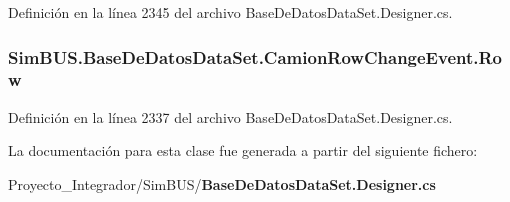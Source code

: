 Definición en la línea 2345 del archivo Base\-De\-Datos\-Data\-Set.\-Designer.\-cs.

\subsubsection[{Row}]{ Sim\-B\-U\-S.\-Base\-De\-Datos\-Data\-Set.\-Camion\-Row\-Change\-Event.\-Row\hspace{0.3cm}{\ttfamily [get]}}\label{class_sim_b_u_s_1_1_base_de_datos_data_set_1_1_camion_row_change_event_aafff5514c293605287bb2cf37259b97c}


Definición en la línea 2337 del archivo Base\-De\-Datos\-Data\-Set.\-Designer.\-cs.



La documentación para esta clase fue generada a partir del siguiente fichero\-:\begin{DoxyCompactItemize}
\item 
Proyecto\-\_\-\-Integrador/\-Sim\-B\-U\-S/{\bf Base\-De\-Datos\-Data\-Set.\-Designer.\-cs}\end{DoxyCompactItemize}

